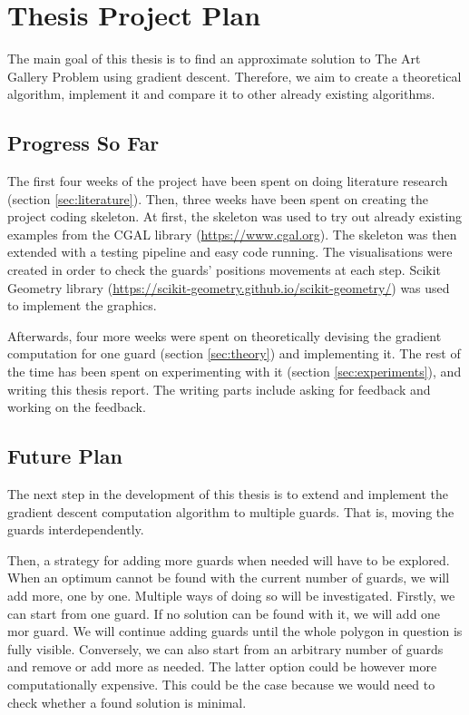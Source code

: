 \section{Thesis Project Plan}
\label{sec:thesis}
The main goal of this thesis is to find an approximate solution to The Art Gallery Problem \cite{o1987art} using gradient descent. Therefore, we aim to create a theoretical algorithm, implement it and compare it to other already existing algorithms.

\subsection{Progress So Far}
The first four weeks of the project have been spent on doing literature research (section \ref{sec:literature}). Then, three weeks have been spent on creating the project coding skeleton. At first, the skeleton was used to try out already existing examples from the CGAL library (\url{https://www.cgal.org}). The skeleton was then extended with a testing pipeline and easy code running. The visualisations were created in order to check the guards' positions movements at each step. Scikit Geometry library (\url{https://scikit-geometry.github.io/scikit-geometry/}) was used to implement the graphics.

Afterwards, four more weeks were spent on theoretically devising the gradient computation for one guard (section \ref{sec:theory}) and implementing it. The rest of the time has been spent on experimenting with it (section \ref{sec:experiments}), and writing this thesis report. The writing parts include asking for feedback and working on the feedback.

\subsection{Future Plan}
The next step in the development of this thesis is to extend and implement the gradient descent computation algorithm to multiple guards. That is, moving the guards interdependently. 

Then, a strategy for adding more guards when needed will have to be explored. When an optimum cannot be found with the current number of guards, we will add more, one by one. Multiple ways of doing so will be investigated. Firstly, we can start from one guard. If no solution can be found with it, we will add one mor guard. We will continue adding guards until the whole polygon in question is fully visible. Conversely, we can also start from an arbitrary number of guards and remove or add more as needed. The latter option could be however more computationally expensive. This could be the case because we would need to check whether a found solution is minimal.

